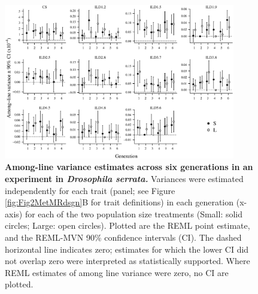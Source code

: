 \FloatBarrier
\newpage
\begin{figure}
    \centering
    \includegraphics[width=0.9\textwidth]{Chp2_Meta/Fig5VlBounce.eps}
    \caption[Among-line variance estimates across six generations in an experiment in \textit{Drosophila serrata.}]{\textbf{Among-line variance estimates across six generations in an experiment in \textit{Drosophila serrata.}} Variances were estimated independently for each trait (panel; see Figure \ref{fig:Fig2MetMRdsgn}B for trait definitions) in each generation (x-axis) for each of the two population size treatments (Small: solid circles; Large: open circles). Plotted are the REML point estimate, and the REML-MVN 90\% confidence intervals (CI). The dashed horizontal line indicates zero;  estimates for which the lower CI did not overlap zero were interpreted as statistically supported. Where REML estimates of among line variance were zero, no CI are plotted.}
    \label{fig:Fig5VlBounce}
\end{figure}

